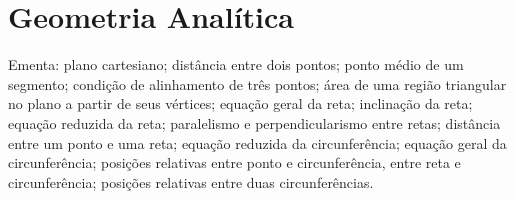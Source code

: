 \chapter{Geometria Analítica}
Ementa:  
plano cartesiano; distância entre dois pontos; ponto médio de um segmento; condição de alinhamento de três pontos; área de uma região triangular no plano a partir de seus
vértices; 
equação geral da reta; inclinação da reta; equação reduzida da reta; 
paralelismo e perpendicularismo entre retas; 
distância entre um ponto e uma reta; 
equação reduzida da circunferência; 
equação geral da circunferência; 
posições relativas entre ponto e circunferência, entre reta e circunferência; posições relativas entre duas circunferências.
